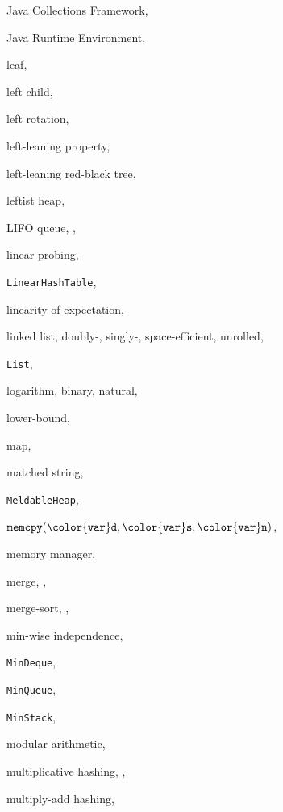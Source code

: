 \documentclass[10pt]{book}
\theoremstyle{plain}
\theoremstyle{definition}
\begin{document}
\begin{theindex}
  \indexspace

  \item Java Collections Framework, 
  \item Java Runtime Environment, 

  \indexspace

  \item leaf, 
  \item left child, 
  \item left rotation, 
  \item left-leaning property, 
  \item left-leaning red-black tree, 
  \item leftist heap, 
  \item LIFO queue, , 
  \item linear probing, 
  \item \texttt{LinearHashTable}, 
  \item linearity of expectation, 
  \item linked list, 
    \subitem doubly-, 
    \subitem singly-, 
    \subitem space-efficient, 
    \subitem unrolled, 
  \item \texttt{List}, 
  \item logarithm, 
    \subitem binary, 
    \subitem natural, 
  \item lower-bound, 

  \indexspace

  \item map, 
  \item matched string, 
  \item \texttt{MeldableHeap}, 
  \item \ensuremath{\mathtt{memcpy({\color{var}d},{\color{var}s},{\color{var}n})}}, 
  \item memory manager, 
  \item merge, , 
  \item merge-sort, , 
  \item min-wise independence, 
  \item \texttt{MinDeque}, 
  \item \texttt{MinQueue}, 
  \item \texttt{MinStack}, 
  \item modular arithmetic, 
  \item multiplicative hashing, , 
  \item multiply-add hashing, 


\end{theindex}
\end{document}
